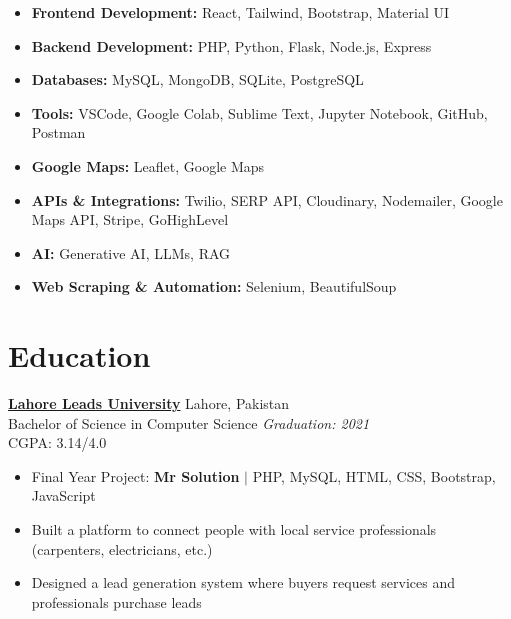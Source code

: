 \documentclass[a4paper,12pt]{article}
\begin{document}
\begin{itemize}[leftmargin=*]
    \item \textbf{Frontend Development:} React, Tailwind, Bootstrap, Material UI
    \item \textbf{Backend Development:} PHP, Python, Flask, Node.js, Express
    \item \textbf{Databases:} MySQL, MongoDB, SQLite, PostgreSQL
    \item \textbf{Tools:} VSCode, Google Colab, Sublime Text, Jupyter Notebook, GitHub, Postman
    \item \textbf{Google Maps:} Leaflet, Google Maps
    \item \textbf{APIs \& Integrations:} Twilio, SERP API, Cloudinary, Nodemailer, Google Maps API, Stripe, GoHighLevel
    \item \textbf{AI:} Generative AI, LLMs, RAG
    \item \textbf{Web Scraping \& Automation:} Selenium, BeautifulSoup
\end{itemize}


\section{Education}

\textbf{\href{https://leads.edu.pk/}{Lahore Leads University}} \hfill Lahore, Pakistan \\
Bachelor of Science in Computer Science \hfill \textit{Graduation: 2021} \\
CGPA: 3.14/4.0

\begin{itemize}[leftmargin=*]
    \item Final Year Project: \textbf{Mr Solution} $|$ PHP, MySQL, HTML, CSS, Bootstrap, JavaScript
    \item Built a platform to connect people with local service professionals (carpenters, electricians, etc.)
    \item Designed a lead generation system where buyers request services and professionals purchase leads
\end{itemize}


\end{document}
